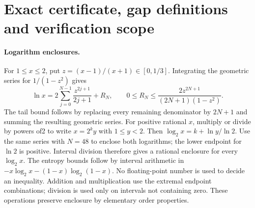﻿\appendix
\section{Exact certificate, gap definitions and verification scope}\label{app:certificate}
\paragraph{Logarithm enclosures.}
For $1\le x\le2$, put $z=(x-1)/(x+1)\in[0,1/3]$. Integrating the
geometric series for $1/(1-z^2)$ gives
\[
 \ln x=2\sum_{j=0}^{N-1}\frac{z^{2j+1}}{2j+1}+R_N,
 \qquad
 0\le R_N\le\frac{2z^{2N+1}}{(2N+1)(1-z^2)}.
\]
The tail bound follows by replacing every remaining denominator by
$2N+1$ and summing the resulting geometric series. For positive rational
$x$, multiply or divide by powers of2 to write $x=2^k y$ with $1\le y<2$.
Then $\log_2x=k+\ln y/\ln2$. Use the same series with $N=48$ to enclose
both logarithms; the lower endpoint for $\ln2$ is positive.
Interval division therefore gives a rational enclosure for every
$\log_2x$. The entropy bounds follow by interval arithmetic in
$-x\log_2x-(1-x)\log_2(1-x)$. No floating-point number is used to decide
an inequality. Addition and multiplication use the extremal endpoint
combinations; division is used only on intervals not containing zero.
These operations preserve enclosure by elementary order properties.

